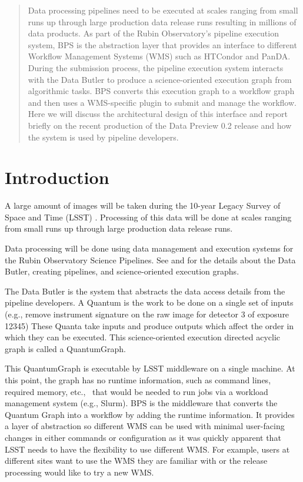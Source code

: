 \documentclass[11pt,twoside]{article}
\begin{document}
\begin{abstract}

Data processing pipelines need to be executed at scales ranging from
small runs up through large production data release runs resulting in
millions of data products.  As part of the Rubin Observatory's pipeline
execution system, BPS is the abstraction layer that provides an interface
to different Workflow Management Systems (WMS) such as HTCondor and PanDA.
During the submission process, the pipeline execution system interacts
with the Data Butler to produce a science-oriented execution graph from
algorithmic tasks.  BPS converts this execution graph to a workflow graph
and then uses a WMS-specific plugin to submit and manage the workflow.
Here we will discuss the architectural design of this interface and
report briefly on the recent production of the Data Preview 0.2 release
and how the system is used by pipeline developers.

\end{abstract}

\section{Introduction}

A large amount of images will be taken during the 10-year Legacy Survey
of Space and Time (LSST) \citep{2019ApJ...873..111I, I08_adassxxxii}.  Processing of this
data will be done at scales ranging from small runs up through large
production data release runs.

Data processing will be done using data management and execution systems
for the Rubin Observatory Science Pipelines. See \citet{C24_adassxxxii}
and \citet{2022SPIE12189E..11J} for the details about the Data Butler,
creating pipelines, and science-oriented execution graphs.

The Data Butler is the system that abstracts the data access details from
the pipeline developers.  A Quantum is the work to be done on a single set
of inputs (e.g., remove instrument signature on the raw image for detector
3 of exposure 12345) These Quanta take inputs and produce outputs which
affect the order in which they can be executed.  This science-oriented
execution directed acyclic graph is called a QuantumGraph.

This QuantumGraph is executable by LSST middleware on a single machine.
At this point, the graph has no runtime information, such as command
lines, required memory, etc.,~ that would be needed to run jobs via
a workload management system (e.g., Slurm).  BPS is the middleware
that converts the Quantum Graph into a workflow by adding the runtime
information. It provides a layer of abstraction so different WMS can be
used with minimal user-facing changes in either commands or configuration
as it was quickly apparent that LSST needs to have the flexibility to
use different WMS. For example, users at different sites want to use
the WMS they are familiar with or the release processing would like to
try a new WMS.
\end{document}
